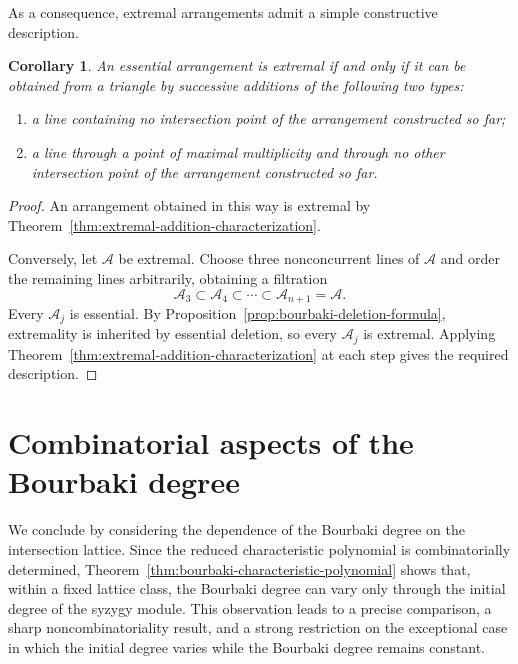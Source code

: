 \documentclass[11pt]{amsart}   %
\newtheorem{Corollary}[Theorem]{Corollary}
\theoremstyle{definition}
\def\A{{\mathcal A}}
\begin{document}
As a consequence, extremal arrangements admit a simple constructive description.

\begin{Corollary}
\label{cor:extremal-constructive-characterization}
An essential arrangement is extremal if and only if it can be obtained from a triangle by successive additions of the following two types:
\begin{enumerate}
\item a line containing no intersection point of the arrangement
constructed so far;

\item a line through a point of maximal multiplicity and through no
other intersection point of the arrangement constructed so far.
\end{enumerate}
\end{Corollary}

\begin{proof}
An arrangement obtained in this way is extremal by Theorem~\ref{thm:extremal-addition-characterization}.

Conversely, let $\A$ be extremal. Choose three nonconcurrent lines of $\A$ and order the remaining lines arbitrarily, obtaining a filtration
\[
\A_3\subset\A_4\subset\cdots\subset\A_{n+1}=\A.
\]
Every $\A_j$ is essential. By Proposition~\ref{prop:bourbaki-deletion-formula}, extremality is inherited by essential deletion, so every $\A_j$ is extremal. Applying Theorem~\ref{thm:extremal-addition-characterization} at each step gives the required description.
\end{proof}

\section{Combinatorial aspects of the Bourbaki degree}
\label{sec:combinatorics-bourbaki-degree}

We conclude by considering the dependence of the Bourbaki degree on the intersection lattice. Since the reduced characteristic polynomial is combinatorially determined, Theorem~\ref{thm:bourbaki-characteristic-polynomial} shows that, within a fixed lattice class, the Bourbaki degree can vary only through the initial degree of the syzygy module. This observation leads to a precise comparison, a sharp noncombinatoriality result, and a strong restriction on the exceptional case in which the initial degree varies while the Bourbaki degree remains constant.
\end{document}
